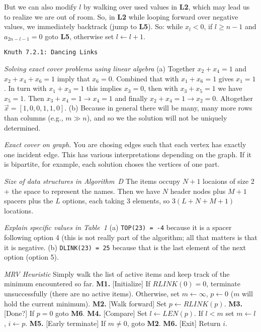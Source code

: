 But we can also modify $l$ by walking over used values in {\bf L2}, which
may lead us to realize we are out of room.  So, in {\bf L2} while looping
forward over negative values, we immediately backtrack (jump to {\bf L5}).
So: while $x_l < 0$, if $l \ge n - 1$ and $a_{2 n - l - 1} = 0$ goto {\bf L5},
otherwise set $l \leftarrow l + 1$.


\topglue 0.5in
\centerline{\tt Knuth 7.2.1: Dancing Links}
\vskip 0.3in

 {\it Solving exact cover problems using
linear algebra}\hfil\break
(a) Together $x_2 + x_4 = 1$ and $x_2 + x_4 + x_6 = 1$
imply that $x_6 = 0$.  Combined that with $x_1 + x_6 = 1$
gives $x_1 = 1$.  In turn with $x_1 + x_3 = 1$ this implies
$x_3 = 0$, then with $x_3 + x_5 = 1$ we have $x_5 = 1$.
Then $x_3 + x_4 = 1 \rightarrow x_4 = 1$ and finally
$x_2 + x_4 = 1 \rightarrow x_2 = 0$.  Altogether
$\vec{x} = [1, 0, 0, 1, 1, 0]$.\hfil\break
(b) Because in general there will be many, many more
rows than columns (e.g., $m \gg n$), and so we the solution
will not be uniquely determined.

 {\it Exact cover on graph.}\hfil\break
You are chosing edges such that each vertex has exactly one incident edge.
This has various interpretations depending on the graph.  If it is bipartite, for
example, each solution choses the vertices of one part.

 {\it Size of data structures in Algorithm~D}\hfil\break
The items occupy $N+1$ locaions of size 2 + the space to represent the names.
Then we have $N$ header nodes plus $M+1$ spacers plus the $L$ options,
each taking 3 elements, so $3\left(L + N + M + 1\right)$ locations.

 {\it Explain specific values in Table~1}\hfil\break
(a) {\tt TOP(23) = -4} because it is a spacer following option 4 (this is not
really part of the algorithm; all that matters is that it is negative.\hfil\break
(b) {\tt DLINK(23) = 25} because that is the last element of the next option
(option 5).

 {\it MRV Heuristic}\hfil\break
Simply walk the list of active items and keep track of the minimum encountered
so far.\hfil\break
{\bf M1.} [Initialize] If $RLINK\left(0\right) = 0$, terminate unsuccessfully (there are no
 active items).  Otherwise, set $m \leftarrow \infty$, $p \leftarrow 0$ ($m$ will hold
 the current minimum).\hfil\break
{\bf M2.} [Walk forward] Set $p \leftarrow RLINK\left(p\right)$.\hfil\break
{\bf M3.} [Done?] If $p = 0$ goto {\bf M6}.\hfil\break
{\bf M4.} [Compare] Set $l \leftarrow LEN\left(p\right)$.  If $l < m$ set $m \leftarrow l$,
 $i \leftarrow p$.\hfil\break
{\bf M5.} [Early terminate] If $m \ne 0$, goto {\bf M2}.\hfil\break
{\bf M6.} [Exit] Return $i$.\hfil\break

